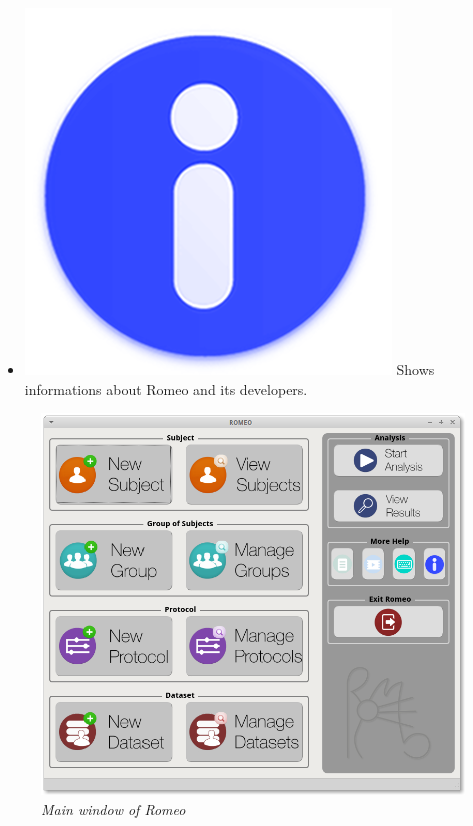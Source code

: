 \begin{itemize}
\item \includegraphics[scale=0.085]{./Images/about} Shows informations about Romeo and its developers.
\end{itemize}
\begin{figure}[!h]
\begin{center}
\includegraphics[scale=0.4]{./Images/MainWindow}
\caption{\textit{Main window of Romeo}}
\label{workareaimg}
\end{center}
\end{figure}

